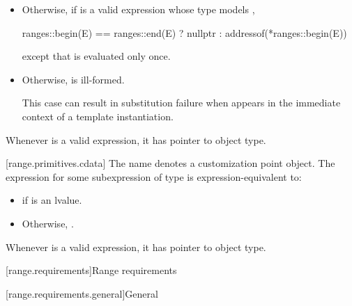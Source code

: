 \begin{addedblock}
\begin{itemize}
\item
  Otherwise, if  is a valid expression whose type models
  ,
  \begin{codeblock}
  ranges::begin(E) == ranges::end(E) ? nullptr : addressof(*ranges::begin(E))
  \end{codeblock}
  except that  is evaluated only once.

\item
  Otherwise,  is ill-formed.
  {\color{newclr}
  \begin{note}
  This case can result in substitution failure when 
  appears in the immediate context of a template instantiation.
  \end{note}
  } %
\end{itemize}

\pnum
\begin{note}
Whenever  is a valid expression, it
has pointer to object type.
\end{note}

[range.primitives.cdata]{}
\pnum
The name  denotes a customization point
object. The expression
 for some subexpression  of type 
is expression-equivalent to:
\begin{itemize}
\item {} if  is an lvalue.

\item Otherwise, .
\end{itemize}

\pnum
\begin{note}
Whenever  is a valid expression, it
has pointer to object type.
\end{note}

[range.requirements]{Range requirements}

[range.requirements.general]{General}


\end{addedblock}
